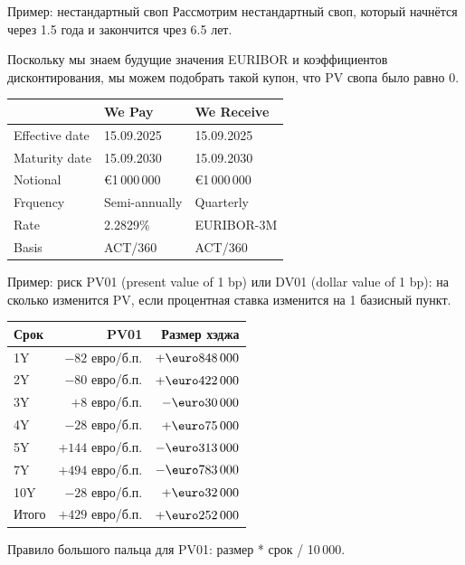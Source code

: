 \documentclass{beamer}
\renewcommand{\EUR}[1]{\textup{\euro}#1}
\begin{document}
\begin{frame}{Пример: нестандартный своп}
\justify
Рассмотрим нестандартный своп, который начнётся через 1.5 года и закончится чрез 6.5 лет.

\justify
Поскольку мы знаем будущие значения EURIBOR и коэффициентов дисконтирования, мы можем 
подобрать такой купон, что PV свопа было равно 0.

\justify
\centering
\begin{tabular}{l|l|l}
& We Pay & We Receive \\ \hline
Effective date & 15.09.2025 & 15.09.2025 \\ 
Maturity date  & 15.09.2030 & 15.09.2030 \\
Notional       & \EUR{1\,000\,000} & \EUR{1\,000\,000} \\
Frquency       & Semi-annually     & Quarterly \\
Rate           & \alert{2.2829\%}          & EURIBOR-3M   \\
Basis          & ACT/360           & ACT/360
\end{tabular}
\end{frame}



\begin{frame}{Пример: риск}
\justify
PV01 (present value of 1 bp) или DV01 (dollar value of 1 bp): на сколько изменится
PV, если процентная ставка изменится на 1 базисный пункт.

\justify
\centering
\begin{tabular}{l|r|r}
Срок  & PV01 & Размер хэджа \\ \hline
1Y   & $-82$  евро/б.п. & $+\EUR{848\,000}$ \\
2Y    & $-80$ евро/б.п. & $+\EUR{422\,000}$ \\
3Y    & $+8$ евро/б.п. & $-\EUR{30\,000}$ \\
4Y    & $-28$  евро/б.п. & $+\EUR{75\,000}$ \\
5Y    & $+144$ евро/б.п. & $-\EUR{313\,000}$ \\ 
7Y    & $+494$ евро/б.п. & $-\EUR{783\,000}$ \\ 
10Y    & $-28$ евро/б.п. & $+\EUR{32\,000}$ \\ \hline
Итого & $+429$ евро/б.п. & $+\EUR{252\,000}$
\end{tabular}

\justify
Правило большого пальца для PV01: размер * срок / 10\,000.
\end{frame}
\end{document}
